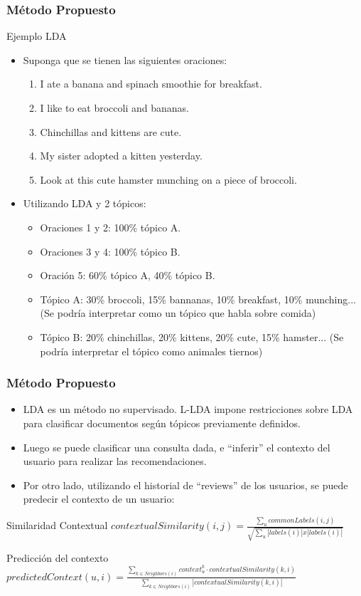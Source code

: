\documentclass{beamer}
\begin{document}
\begin{frame}
\frametitle{Método Propuesto}
Ejemplo LDA
\begin{itemize}
\item Suponga que se tienen las siguientes oraciones:
\begin{enumerate}
\item I ate a banana and spinach smoothie for breakfast.
\item I like to eat broccoli and bananas.
\item Chinchillas and kittens are cute.
\item My sister adopted a kitten yesterday.
\item Look at this cute hamster munching on a piece of broccoli.
\end{enumerate}
\item Utilizando LDA y 2 tópicos:
\begin{itemize}
\item Oraciones 1 y 2: 100\% tópico A.
\item Oraciones 3 y 4: 100\% tópico B.
\item Oración 5: 60\% tópico A, 40\% tópico B.
\item Tópico A: 30\% broccoli, 15\% bannanas, 10\% breakfast, 10\% munching... (Se podría interpretar como un tópico que habla sobre comida)
\item Tópico B: 20\% chinchillas, 20\% kittens, 20\% cute, 15\% hamster... (Se podría interpretar el tópico como animales tiernos)
\end{itemize}
\end{itemize}
\end{frame}

\begin{frame}
\frametitle{Método Propuesto}
\begin{itemize}
\item LDA es un método no supervisado. L-LDA impone restricciones sobre LDA para clasificar documentos según tópicos previamente definidos.
\item Luego se puede clasificar una consulta dada, e ``inferir'' el contexto del usuario para realizar las recomendaciones.
\item Por otro lado, utilizando el historial de ``reviews'' de los usuarios, se puede predecir el contexto de un usuario:
\end{itemize}

\begin{block}{Similaridad Contextual}
$contextualSimilarity(i, j) = \displaystyle \frac{\sum_u commonLabels(i, j)}{\sqrt{\sum_u |labels(i)|x|labels(i)|}}$
\end{block}

\begin{block}{Predicción del contexto}
$predictedContext(u, i) = \displaystyle \frac{\sum_{k\in Neighbors(i)}context_u^k\cdot contextualSimilarity(k, i)}{\sum_{k\in Neighbors(i)} |contextualSimilarity(k, i)|}$
\end{block}

\end{frame}
\end{document}
